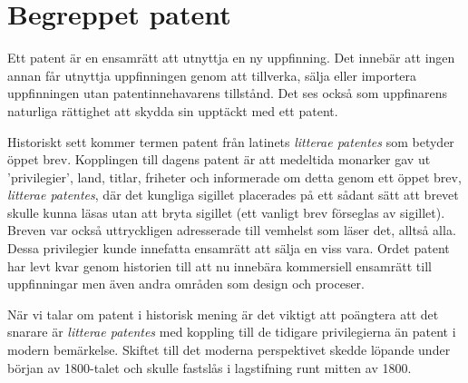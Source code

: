 \section{Begreppet patent} %
\label{sec:lit}

Ett patent är en ensamrätt att utnyttja en ny uppfinning.
Det innebär att ingen annan får utnyttja uppfinningen genom att tillverka, sälja eller importera uppfinningen utan patentinnehavarens tillstånd.
Det ses också som uppfinarens naturliga rättighet att skydda sin upptäckt med ett patent.

Historiskt sett kommer termen patent från latinets \emph{litterae patentes} som
betyder öppet brev. Kopplingen till dagens patent är att medeltida monarker gav
ut 'privilegier', land, titlar, friheter och informerade om detta genom ett
öppet brev, \emph{litterae patentes}, där det kungliga sigillet placerades på
ett sådant sätt att brevet skulle kunna läsas utan att bryta sigillet\cite{blackstone} (ett vanligt brev förseglas av sigillet). Breven var också uttryckligen adresserade till 
vemhelst som läser det, alltså alla. Dessa privilegier kunde innefatta ensamrätt
att sälja en viss vara. Ordet patent har levt kvar genom historien till 
att nu innebära kommersiell ensamrätt till uppfinningar men även andra områden som design och proceser. 

När vi talar om patent i historisk mening är det viktigt att poängtera att det 
snarare är \emph{litterae patentes} med koppling till de tidigare 
privilegierna än patent i modern bemärkelse. Skiftet till det moderna perspektivet skedde löpande under början av 1800-talet och skulle fastslås i lagstifning runt mitten av 1800.

